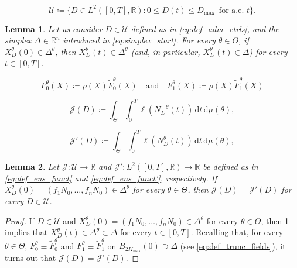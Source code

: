 \documentclass[10pt,a4paper]{amsart}
\newtheorem{lemma}{Lemma}
\newcommand{\J}{\mathcal{J}}
\newcommand{\R}{\mathbb{R}}
\newcommand{\U}{\mathcal{U}}
\newcommand{\de}{\,\mathrm{d}}
\begin{document}
\begin{equation}\label{eq:def_adm_ctrls}
    \U\coloneqq \{ {D} \in L^2([0,T],\R): 0\leq {D(t)\leq D_{\max} } \, \mbox{ for a.e. } t \}.
\end{equation}

\begin{lemma}  \label{lem:domain_invariance}
    Let us consider ${D}\in \U$ defined as in \cref{eq:def_adm_ctrls}, and the simplex $\Delta \in \R^{n}$ introduced in \cref{eq:simplex_start}.
    For every $\theta \in \Theta$, if ${X_D^\theta(0)}\in \Delta^{\theta}$, then ${X_D^\theta(t)} \in \Delta^{\theta}$ {(and, in particular, $X_D^\theta(t) \in \Delta$)} for every $t \in [0,T]$.
\end{lemma}

\begin{equation} \label{eq:def_trunc_fields}
    F_0^\theta({X}) \coloneqq \rho({X})\tilde F_0^\theta ({X}) 
    \quad \mbox{and} \quad
    F_1^\theta ({X}) \coloneqq \rho({X}) \tilde F_1^\theta ({X}) 
\end{equation}

\begin{equation} \label{eq:def_ens_funct}
    \J({D}) \coloneqq  \int_\Theta  \int_0^T \ell\left({N_D}^\theta({t} )\right)  
    \de {t} \de\mu(\theta),
\end{equation}

\begin{equation} \label{eq:def_ens_funct'}
    \J'({D})\coloneqq \int_\Theta  \int_0^T \ell\left({N_D^\theta(t)}\right)  
    \de {t} \de\mu(\theta),
\end{equation}

\begin{lemma} \label{lem:extension}
    Let $\J\colon \U\to\R$ and $\J'\colon L^2([0,T],\R)\to \R$ be defined as in \cref{eq:def_ens_funct} and \cref{eq:def_ens_funct'}, respectively.
    If ${X_D^\theta}(0) = \left( {f_1N_0,\ldots, f_nN_0} \right)\in \Delta^{\theta}$ for every $\theta \in \Theta$, then $\J({D})=\J'({D})$ for every ${D} \in\U$.
\end{lemma}

\begin{proof}
    If ${D}\in\U$ and ${X_D^\theta}(0) = \left( {f_1N_0,\ldots, f_nN_0} \right)\in \Delta^{\theta}$ for every $\theta \in \Theta$, then \cref{lem:domain_invariance} implies that ${X_D^\theta(t)} \in \Delta^{\theta} {\subset \Delta}$ for every ${t}\in[0,T]$.
    Recalling that, for every $\theta\in\Theta$, $F_0^\theta \equiv \tilde F_0^\theta$ and $F_1^\theta \equiv \tilde F_1^\theta$ on $B_{2{K_{\max}}}(0)\supset \Delta$ (see \cref{eq:def_trunc_fields}), it turns out that $\J({D})=\J'({D})$.
\end{proof}
\end{document}
